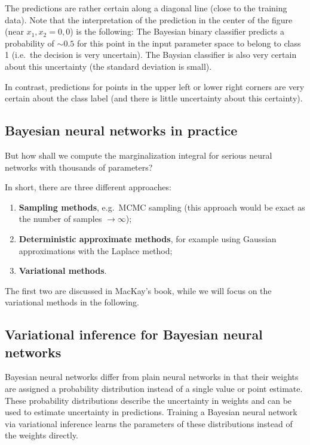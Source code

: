 \documentclass[%
oneside,                 %
final,                   %
10pt]{article}
\begin{document}
The predictions are rather certain along a diagonal line (close to the training data). Note that the interpretation of the prediction in the center of the figure (near $x_1,x_2 = 0,0$) is the following: The Bayesian binary classifier predicts a probability of $\sim 0.5$ for this point in the input parameter space to belong to class 1 (i.e.~the decision is very uncertain). The Baysian classifier is also very certain about this uncertainty (the standard deviation is small).

In contrast, predictions for points in the upper left or lower right corners are very certain about the class label (and there is little uncertainty about this certainty).



\subsection{Bayesian neural networks in practice}
But how shall we compute the marginalization integral for serious neural networks with thousands of parameters?

In short, there are three different approaches:

\begin{enumerate}
\item \textbf{Sampling methods}, e.g.~MCMC sampling (this approach would be exact as the number of samples $\rightarrow \infty$);

\item \textbf{Deterministic approximate methods}, for example using Gaussian approximations with the Laplace method;

\item \textbf{Variational methods}.
\end{enumerate}

\noindent
The first two are discussed in MacKay's book, while we will focus on the variational methods in the following.

\subsection{Variational inference for Bayesian neural networks}

Bayesian neural networks differ from plain neural networks in that their weights are assigned a probability distribution instead of a single value or point estimate. These probability distributions describe the uncertainty in weights and can be used to estimate uncertainty in predictions. Training a Bayesian neural network via variational inference learns the parameters of these distributions instead of the weights directly.
\end{document}

